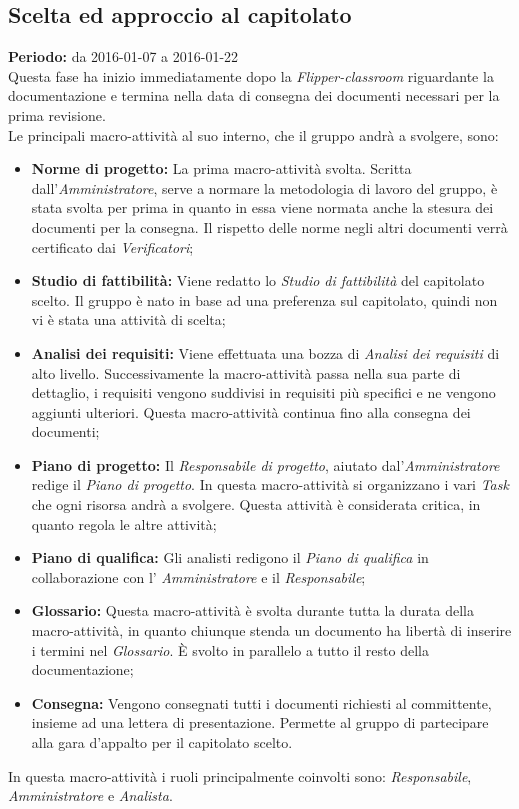 \documentclass[a4paper]{article}
\begin{document}
		\subsection{Scelta ed approccio al capitolato}
			\textbf{Periodo:} da 2016-01-07 a 2016-01-22 \\
			Questa fase ha inizio immediatamente dopo la \emph{Flipper-classroom} riguardante la documentazione e termina nella data
			di consegna dei documenti necessari per la prima revisione. \\ 
			Le principali macro-attività al suo interno, che il gruppo andrà a svolgere, sono:
			\begin{itemize}
				\item \textbf{Norme di progetto:} La prima macro-attività svolta. Scritta dall'\emph{Amministratore}, serve a normare
				la metodologia di lavoro del gruppo, è stata svolta per prima in quanto in essa viene normata anche la stesura
				dei documenti per la consegna. Il rispetto delle norme negli altri documenti verrà certificato dai \emph{Verificatori}; 
				\item \textbf{Studio di fattibilità:} Viene redatto lo \emph{Studio di fattibilità} del capitolato scelto. Il gruppo è
				nato in base ad una preferenza sul capitolato, quindi non vi è stata una attività di scelta;
				\item \textbf{Analisi dei requisiti:} Viene effettuata una bozza di \emph{Analisi dei requisiti} di alto livello. 
				Successivamente la macro-attività passa nella sua parte di dettaglio, i requisiti vengono suddivisi in requisiti più specifici e 
				ne vengono aggiunti ulteriori. Questa macro-attività continua fino alla consegna dei documenti;
				\item \textbf{Piano di progetto:} Il \emph{Responsabile di progetto}, aiutato dal'\emph{Amministratore} redige il 
				\emph{Piano di progetto}. In questa macro-attività si organizzano i vari \emph{Task} che ogni risorsa andrà a svolgere.
				Questa attività è considerata critica, in quanto regola le altre attività;
				\item \textbf{Piano di qualifica:} Gli analisti redigono il \emph{Piano di qualifica} in collaborazione con l'
				\emph{Amministratore} e il \emph{Responsabile};
				\item \textbf{Glossario:} Questa macro-attività è svolta durante tutta la durata della macro-attività, in quanto chiunque
				stenda un documento ha libertà di inserire i termini nel \emph{Glossario}. È svolto in parallelo a tutto il resto 
				della documentazione;
				\item \textbf{Consegna:} Vengono consegnati tutti i documenti richiesti al committente, insieme ad una lettera di 
				presentazione. Permette al gruppo di partecipare alla gara d'appalto per il capitolato scelto.
			\end{itemize}
			In questa macro-attività i ruoli principalmente coinvolti sono: \emph{Responsabile}, \emph{Amministratore} e \emph{Analista}.
\end{document}
